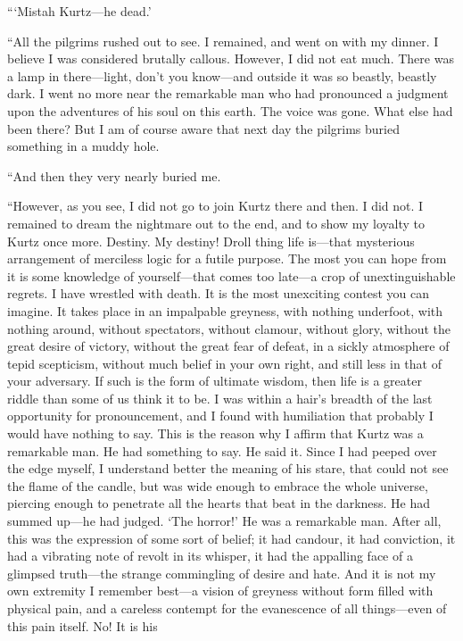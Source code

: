 \documentclass[12pt]{report}
\begin{document}
```Mistah Kurtz---he dead.'

``All the pilgrims rushed out to see. I remained, and went on with my
dinner. I believe I was considered brutally callous. However, I did not
eat much. There was a lamp in there---light, don't you know---and
outside it was so beastly, beastly dark. I went no more near the
remarkable man who had pronounced a judgment upon the adventures of his
soul on this earth. The voice was gone. What else had been there? But I
am of course aware that next day the pilgrims buried something in a
muddy hole.

``And then they very nearly buried me.

``However, as you see, I did not go to join Kurtz there and then. I did
not. I remained to dream the nightmare out to the end, and to show my
loyalty to Kurtz once more. Destiny. My destiny! Droll thing life
is---that mysterious arrangement of merciless logic for a futile
purpose. The most you can hope from it is some knowledge of
yourself---that comes too late---a crop of unextinguishable regrets. I
have wrestled with death. It is the most unexciting contest you can
imagine. It takes place in an impalpable greyness, with nothing
underfoot, with nothing around, without spectators, without clamour,
without glory, without the great desire of victory, without the great
fear of defeat, in a sickly atmosphere of tepid scepticism, without much
belief in your own right, and still less in that of your adversary. If
such is the form of ultimate wisdom, then life is a greater riddle than
some of us think it to be. I was within a hair's breadth of the last
opportunity for pronouncement, and I found with humiliation that
probably I would have nothing to say. This is the reason why I affirm
that Kurtz was a remarkable man. He had something to say. He said it.
Since I had peeped over the edge myself, I understand better the meaning
of his stare, that could not see the flame of the candle, but was wide
enough to embrace the whole universe, piercing enough to penetrate all
the hearts that beat in the darkness. He had summed up---he had judged.
`The horror!' He was a remarkable man. After all, this was the
expression of some sort of belief; it had candour, it had conviction, it
had a vibrating note of revolt in its whisper, it had the appalling face
of a glimpsed truth---the strange commingling of desire and hate. And it
is not my own extremity I remember best---a vision of greyness without
form filled with physical pain, and a careless contempt for the
evanescence of all things---even of this pain itself. No! It is his
\end{document}
